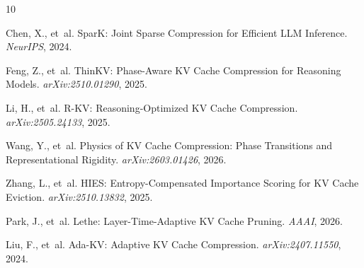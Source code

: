\documentclass[11pt,a4paper]{article}
\begin{document}
\begin{thebibliography}{10}

Chen, X., et~al.
\newblock SparK: Joint Sparse Compression for Efficient LLM Inference.
\newblock \emph{NeurIPS}, 2024.

Feng, Z., et~al.
\newblock ThinKV: Phase-Aware KV Cache Compression for Reasoning Models.
\newblock \emph{arXiv:2510.01290}, 2025.

Li, H., et~al.
\newblock R-KV: Reasoning-Optimized KV Cache Compression.
\newblock \emph{arXiv:2505.24133}, 2025.

Wang, Y., et~al.
\newblock Physics of KV Cache Compression: Phase Transitions and Representational Rigidity.
\newblock \emph{arXiv:2603.01426}, 2026.

Zhang, L., et~al.
\newblock HIES: Entropy-Compensated Importance Scoring for KV Cache Eviction.
\newblock \emph{arXiv:2510.13832}, 2025.

Park, J., et~al.
\newblock Lethe: Layer-Time-Adaptive KV Cache Pruning.
\newblock \emph{AAAI}, 2026.

Liu, F., et~al.
\newblock Ada-KV: Adaptive KV Cache Compression.
\newblock \emph{arXiv:2407.11550}, 2024.

\end{thebibliography}
\end{document}
